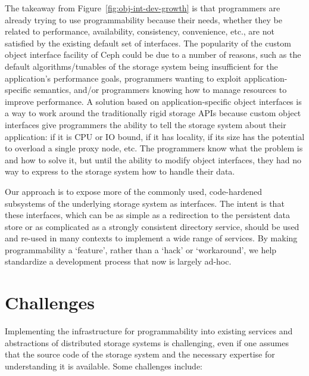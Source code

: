 \documentclass[preprint]{sigplanconf-eurosys}
\begin{document}
The takeaway from Figure~\ref{fig:obj-int-dev-growth} is that programmers are
already trying to use programmability because their needs, whether they be
related to performance, availability, consistency, convenience, etc., are not
satisfied by the existing default set of interfaces. The popularity of the
custom object interface facility of Ceph could be due to a number of reasons,
such as the default algorithms/tunables of the storage system being
insufficient for the application's performance goals, programmers wanting to
exploit application-specific semantics, and/or programmers knowing how to
manage resources to improve performance. A solution based on
application-specific object interfaces is a way to work around the
traditionally rigid storage APIs because custom object interfaces give
programmers the ability to tell the storage system about their application: if
it is CPU or IO bound, if it has locality, if its size has the potential to
overload a single proxy node, etc.  The programmers know what the problem is
and how to solve it, but until the ability to modify object interfaces, they
had no way to express to the storage system how to handle their data.

Our approach is to expose more of the commonly used, code-hardened subsystems
of the underlying storage system as interfaces. The intent is that these
interfaces, which can be as simple as a redirection to the persistent data
store or as complicated as a strongly consistent directory service, should be
used and re-used in many contexts to implement a wide range of services. By
making programmability a `feature', rather than a `hack' or `workaround', we
help standardize a development process that now is largely ad-hoc.

\section{Challenges}
\label{sec:challenges}

Implementing the infrastructure for programmability into existing services and
abstractions of distributed storage systems is challenging, even if one assumes
that the source code of the storage system and the necessary expertise for
understanding it is available.  Some challenges include:
\end{document}
